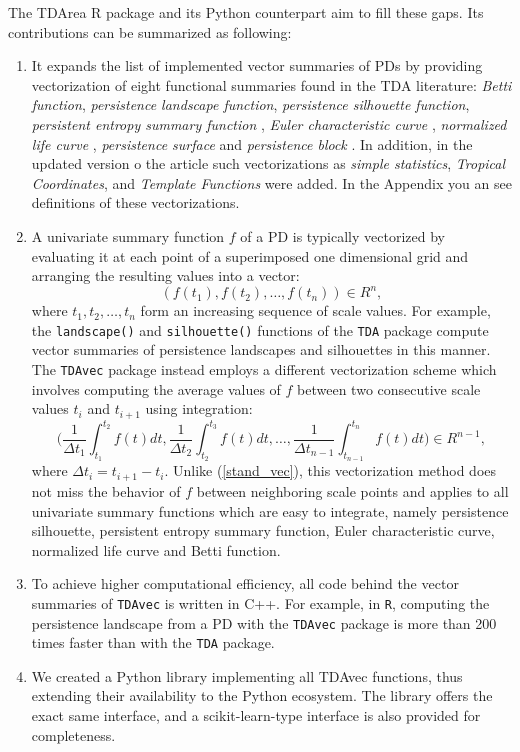 \documentclass[conference, onecolumn]{IEEEtran}
\begin{document}
The TDArea R package and its Python counterpart aim to fill these gaps. Its contributions can be summarized as following:
\begin{enumerate}
\item It expands the list of implemented vector summaries of PDs by providing vectorization of eight functional summaries found in the TDA literature: \emph{Betti function}, \emph{persistence landscape function}, \emph{persistence silhouette function}, \emph{persistent entropy summary function} \cite{atienza2020stability}, \emph{Euler characteristic curve} \cite{richardson2014efficient}, \emph{normalized life curve} \cite{chung2022persistence}, \emph{persistence surface} \cite{adams2017persistence} and \emph{persistence block} \cite{chan2022computationally}. In addition, in the updated version o the article such vectorizations as \emph{simple statistics}, \emph{Tropical Coordinates}, and \emph{Template Functions} \cite{TentFunction} were added. In the Appendix you an see definitions of these vectorizations.
\item A univariate summary function $f$ of a PD is typically vectorized by evaluating it at each point of a superimposed one dimensional grid and arranging the resulting values into a vector:
%
  \begin{equation}\label{stand_vec}
		(f(t_1),f(t_2),\ldots,f(t_n))\in {R}^n,
\end{equation}
where $t_1,t_2,\ldots,t_n$ form an increasing sequence of scale values. For example, the \texttt{landscape()} and \texttt{silhouette()} functions of the \texttt{TDA} package compute vector summaries of persistence landscapes and silhouettes in this manner. The \texttt{TDAvec} package instead employs a different vectorization scheme which involves computing the average values of $f$ between two consecutive scale values $t_i$ and $t_{i+1}$ using integration: 
\begin{equation} 
	\Big(\frac{1}{\Delta t_1}\int_{t_1}^{t_2}f(t)dt,\frac{1}{\Delta t_2}\int_{t_2}^{t_3}f(t)dt,\ldots,\frac{1}{\Delta t_{n-1}}\int_{t_{n-1}}^{t_n}f(t)dt\Big)\in{R}^{n-1}, 
\end{equation}
where $\Delta t_i=t_{i+1}-t_i$. Unlike (\ref{stand_vec}), this vectorization method does not miss the behavior of $f$ between neighboring scale points and applies to all univariate summary functions which are easy to integrate, namely persistence silhouette, persistent entropy summary function, Euler characteristic curve, normalized life curve and Betti function. 
%
\item To achieve higher computational efficiency, all code behind the vector summaries of \texttt{TDAvec} is written in C++. For example, in \texttt{R}, computing the persistence landscape from a PD with the \texttt{TDAvec} package is more than 200 times faster than with the \texttt{TDA} package.
%
\item  We created a Python library implementing all TDAvec functions, thus extending their availability to the Python ecosystem. The library offers the exact same interface, and a scikit-learn-type interface is also provided for completeness.
\end{enumerate}
\end{document}
